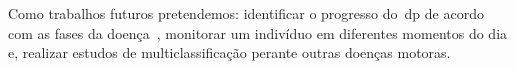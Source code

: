 Como trabalhos futuros pretendemos: identificar o progresso do~\ac{dp} de acordo com as fases da doença~\cite{protpar010}, monitorar um indivíduo em diferentes momentos do dia e, realizar estudos de multiclassificação perante outras doenças motoras.



